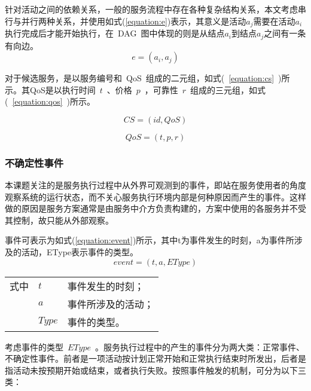 针对活动之间的依赖关系，一般的服务流程中存在各种复杂结构关系，本文考虑串行与并行两种关系，并使用如式(\ref{equation:e})表示，其意义是活动${a_j}$需要在活动${a_i}$执行完成后才能开始执行，在~DAG~图中体现的则是从结点${a_i}$到结点${a_j}$之间有一条有向边。
\begin{equation}\label{equation:e}
e = ({a_i},{a_j})
\end{equation}

对于候选服务，是以服务编号和~QoS~组成的二元组，如式(~\ref{equation:cs}~)所示。其QoS是以执行时间~$t$~、价格~$p$~，可靠性~$r$~组成的三元组，如式(~\ref{equation:qos}~)所示。

\begin{equation}\label{equation:cs}
CS = (id, QoS)
\end{equation}

\begin{equation}\label{equation:qos}
QoS = (t, p, r)
\end{equation}

\subsubsection{不确定性事件} \label{sec:uc_event}

本课题关注的是服务执行过程中从外界可观测到的事件，即站在服务使用者的角度观察系统的运行状态，而不关心服务执行环境内部是何种原因而产生的事件。这样做的原因是服务方案通常是由服务中介方负责构建的，方案中使用的各服务并不受其控制，故只能从外部观察。

事件可表示为如式(\ref{equation:event})所示，其中t为事件发生的时刻，a为事件所涉及的活动，EType表示事件的类型。
\begin{equation}\label{equation:event}
event = (t, a, EType)
\end{equation}
\begin{tabularx}{\textwidth}{@{}l@{\quad}l@{\pozhehao }X@{}}
    式中
    & $t$ & 事件发生的时刻；\\
    & $a$ & 事件所涉及的活动；\\
    & $Type$ &事件的类型。
\end{tabularx}\vspace{\wordsep}

考虑事件的类型~$EType$~。服务执行过程中的产生的事件分为两大类：正常事件、不确定性事件。前者是一项活动按计划正常开始和正常执行结束时所发出，后者是指活动未按预期开始或结束，或者执行失败。按照事件触发的机制，可分为以下三类：

